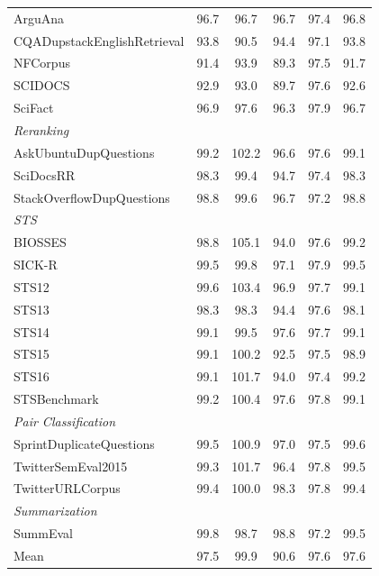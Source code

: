 \documentclass[11pt]{article}
\begin{document}
\begin{table}[t]
{\begin{tabular}{@{}p{5cm}ccccc@{}}
        ArguAna & 96.7 & 96.7 & 96.7 & 97.4 & 96.8 \\
        CQADupstackEnglishRetrieval & 93.8 & 90.5 & 94.4 & 97.1 & 93.8 \\
        NFCorpus & 91.4 & 93.9 & 89.3 & 97.5 & 91.7 \\
        SCIDOCS & 92.9 & 93.0 & 89.7 & 97.6 & 92.6 \\
        SciFact & 96.9 & 97.6 & 96.3 & 97.9 & 96.7 \\
        \midrule
        \multicolumn{6}{l}{\textit{Reranking}} \\
        AskUbuntuDupQuestions & 99.2 & 102.2 & 96.6 & 97.6 & 99.1 \\
        SciDocsRR & 98.3 & 99.4 & 94.7 & 97.4 & 98.3 \\
        StackOverflowDupQuestions & 98.8 & 99.6 & 96.7 & 97.2 & 98.8 \\
        \midrule
        \multicolumn{6}{l}{\textit{STS}} \\
        BIOSSES & 98.8 & 105.1 & 94.0 & 97.6 & 99.2 \\
        SICK-R & 99.5 & 99.8 & 97.1 & 97.9 & 99.5 \\
        STS12 & 99.6 & 103.4 & 96.9 & 97.7 & 99.1 \\
        STS13 & 98.3 & 98.3 & 94.4 & 97.6 & 98.1 \\
        STS14 & 99.1 & 99.5 & 97.6 & 97.7 & 99.1 \\
        STS15 & 99.1 & 100.2 & 92.5 & 97.5 & 98.9 \\
        STS16 & 99.1 & 101.7 & 94.0 & 97.4 & 99.2 \\
        STSBenchmark & 99.2 & 100.4 & 97.6 & 97.8 & 99.1 \\
        \midrule
        \multicolumn{6}{l}{\textit{Pair Classification}} \\
        SprintDuplicateQuestions & 99.5 & 100.9 & 97.0 & 97.5 & 99.6 \\
        TwitterSemEval2015 & 99.3 & 101.7 & 96.4 & 97.8 & 99.5 \\
        TwitterURLCorpus & 99.4 & 100.0 & 98.3 & 97.8 & 99.4 \\
        \midrule
        \multicolumn{6}{l}{\textit{Summarization}} \\
        SummEval & 99.8 & 98.7 & 98.8 & 97.2 & 99.5 \\
        \midrule
        Mean & 97.5 & 99.9 & 90.6 & 97.6 & 97.6 \\
        \bottomrule
    \end{tabular}%
    }
\end{table}
\end{document}
